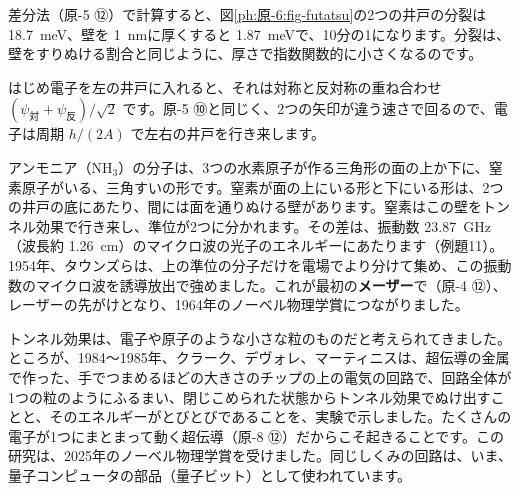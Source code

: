 \begin{bkfigure}
\label{ph:原-6:fig-futatsu}
\end{bkfigure}

\noindent 差分法（原-5 ⑫）で計算すると、図\ref{ph:原-6:fig-futatsu}の2つの井戸の分裂は \qty{18.7}{meV}、壁を \qty{1}{nm}に厚くすると \qty{1.87}{meV}で、10分の1になります。分裂は、壁をすりぬける割合と同じように、厚さで指数関数的に小さくなるのです。

\noindent はじめ電子を左の井戸に入れると、それは対称と反対称の重ね合わせ $(\psi_{\text{対}}+\psi_{\text{反}})/\sqrt2$ です。原-5 ⑩と同じく、2つの矢印が違う速さで回るので、電子は周期 $h/(2A)$ で左右の井戸を行き来します。

アンモニア（NH$_3$）の分子は、3つの水素原子が作る三角形の面の上か下に、窒素原子がいる、三角すいの形です。窒素が面の上にいる形と下にいる形は、2つの井戸の底にあたり、間には面を通りぬける壁があります。窒素はこの壁をトンネル効果で行き来し、準位が2つに分かれます。その差は、振動数 \qty{23.87}{GHz}（波長約 \qty{1.26}{cm}）のマイクロ波の光子のエネルギーにあたります（例題11）。1954年、タウンズらは、上の準位の分子だけを電場でより分けて集め、この振動数のマイクロ波を誘導放出で強めました。これが最初の\textbf{メーザー}で（原-4 ⑫）、レーザーの先がけとなり、1964年のノーベル物理学賞につながりました。

\label{ph:原-6:sec12}
トンネル効果は、電子や原子のような小さな粒のものだと考えられてきました。ところが、1984〜1985年、クラーク、デヴォレ、マーティニスは、超伝導の金属で作った、手でつまめるほどの大きさのチップの上の電気の回路で、回路全体が1つの粒のようにふるまい、閉じこめられた状態からトンネル効果でぬけ出すことと、そのエネルギーがとびとびであることを、実験で示しました。たくさんの電子が1つにまとまって動く超伝導（原-8 ⑫）だからこそ起きることです。この研究は、2025年のノーベル物理学賞を受けました。同じしくみの回路は、いま、量子コンピュータの部品（量子ビット）として使われています。

